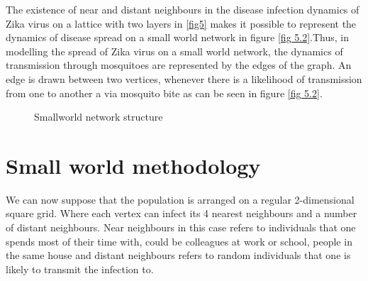 The existence of near and distant neighbours in the disease infection dynamics of Zika virus on a lattice with two layers in \ref{fig5} makes it possible to represent the dynamics of disease spread on a small world network in figure \ref{fig 5.2}.Thus, in modelling the spread of Zika virus on a small world network, the dynamics of transmission through mosquitoes are represented by the edges of the graph. An edge is drawn between two vertices, whenever there is a likelihood of transmission from one to another a via mosquito bite as can be seen in figure \ref{fig 5.2}.
\begin{figure}[h!]
\begin{minipage}[c]{1\textwidth}
 \centering
{}
\end{minipage}
\caption{Smallworld network structure} \label{fig 5.1}
\end{figure}
\section{Small world methodology}

We  can now suppose that the population is arranged on a regular
2-dimensional square grid.  Where each vertex can infect its 4 nearest neighbours and a number of distant neighbours. Near neighbours in this case refers to individuals that one spends most of their time with, could be colleagues at work or school, people in the same house and distant neighbours refers to random individuals that one is likely to transmit the infection to. 
 
